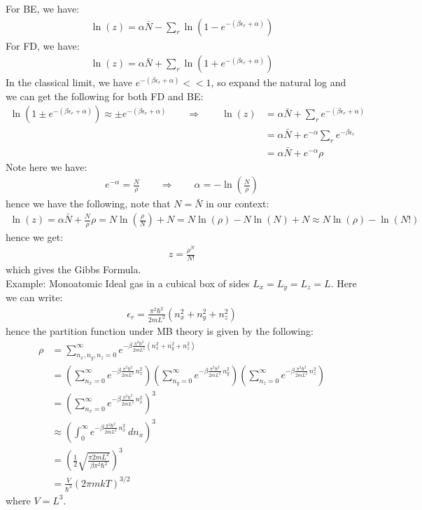 \documentclass[11pt,oneside]{book}
\theoremstyle{break}
\theoremstyle{break}
\newcommand{\example}{\color{green}Example: \color{black}}
\begin{document}
For BE, we have:
\begin{align*}
\ln(z) = \alpha \bar{N} - \sum_r \ln(1 - e^{-(\beta \epsilon_r + \alpha)})
\end{align*}
For FD, we have:
\begin{align*}
\ln(z) = \alpha \bar{N} + \sum_r \ln(1 + e^{-(\beta \epsilon_r + \alpha)})
\end{align*}
In the classical limit, we have $e^{-(\beta \epsilon_r + \alpha)} <<1$, so expand the natural log and we can get the following for both FD and BE:
\begin{align*}
\ln(1\pm e^{-(\beta \epsilon_r + \alpha)})\approx \pm e^{-(\beta \epsilon_r +\alpha)}\qquad\Rightarrow\qquad  \ln(z) &= \alpha\bar{N} + \sum_r e^{-(\beta \epsilon_r +\alpha)}\\
&= \alpha \bar{N} + e^{-\alpha} \sum_r e^{-\beta \epsilon_r} \\
&= \alpha\bar{N} + e^{-\alpha}\rho
\end{align*}
Note here we have:
\begin{align*}
e^{-\alpha} = \frac{N}{\rho} \qquad \Rightarrow \qquad \alpha = -\ln\left( \frac{N}{\rho}\right)
\end{align*}
hence we have the following, note that $N = \bar{N}$ in our context:
\begin{align*}
\ln(z) = \alpha\bar{N}+\frac{N}{\rho}\rho = N \ln \left( \frac{\rho}{N}\right) + N = N \ln(\rho) - N \ln(N) + N \approx N \ln(\rho) - \ln(N!)
\end{align*}
hence we get:
\begin{align*}
z = \frac{\rho^N }{N!}
\end{align*}
which gives the Gibbs Formula. \\


\example Monoatomic Ideal gas in a cubical box of sides $L_x = L_y = L_z=L$. Here we can write:
\begin{align*}
\epsilon_r = \frac{\pi^2 \hbar^2}{2mL^2}\left(n_x^2 + n_y^2 + n_z^2 \right)
\end{align*}
hence the partition function under MB theory is given by the following:
\begin{align*}
\rho &= \sum_{n_x, n_y, n_z = 0}^{\infty} e^{-\beta \frac{\pi^2 \hbar^2}{2mL^2}\left(n_x^2 + n_y^2 + n_z^2 \right)}\\
&= \left(\sum_{n_x = 0}^\infty e^{-\beta \frac{\pi^2 \hbar^2}{2mL^2}\,n_x^2}\right)\left(\sum_{n_y = 0}^\infty e^{-\beta \frac{\pi^2 \hbar^2}{2mL^2}\,n_y^2}\right)\left(\sum_{n_z = 0}^\infty e^{-\beta \frac{\pi^2 \hbar^2}{2mL^2}\,n_z^2}\right)\\
&= \left(\sum_{n_x = 0}^\infty e^{-\beta \frac{\pi^2 \hbar^2}{2mL^2}\,n_x^2}\right)^3\\
&\approx \left(\int_0^{\infty} e^{-\beta \frac{\pi^2 \hbar^2}{2mL^2}\,n_x^2} \, dn_x\right)^3\\
&= \left( \frac{1}{2} \sqrt{\frac{\pi 2mL^2}{\beta \pi^2 \hbar^2}}\right)^3\\
&= \frac{V}{\hbar^3} (2\pi mkT)^{3/2}
\end{align*}
where $V = L^3$.
\end{document}

